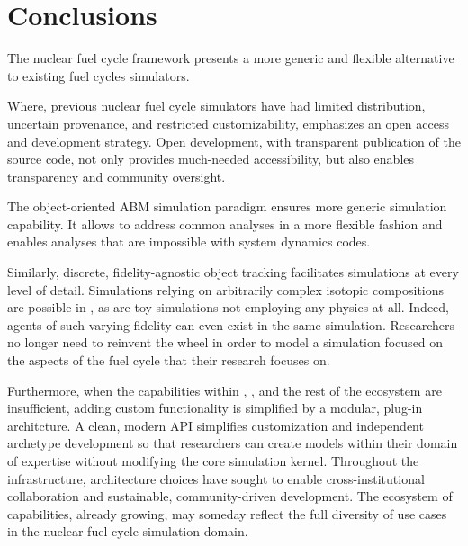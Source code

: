 

\section{Conclusions}


The \Cyclus nuclear fuel cycle framework presents a more generic and flexible 
alternative to existing fuel cycles simulators. 

Where, previous nuclear fuel cycle simulators have had limited distribution, 
uncertain provenance, and restricted customizability, \Cyclus emphasizes an 
open access and development strategy.  Open development, with transparent 
publication of the source code, not only provides much-needed accessibility, 
but also enables transparency and community oversight. 

The object-oriented \acrlong{ABM} simulation paradigm ensures more generic 
simulation capability. It allows \Cyclus to address common analyses in a more 
flexible fashion and enables analyses that are impossible with system dynamics 
codes. 

Similarly, discrete, fidelity-agnostic object tracking facilitates simulations 
at every level of detail. Simulations relying on arbitrarily complex isotopic 
compositions are possible in \Cyclus, as are  toy simulations not employing any 
physics at all. Indeed, agents of such varying fidelity can even exist in the 
same simulation. Researchers no longer need to reinvent the wheel in order to 
model a simulation focused on the aspects of the fuel cycle that their research 
focuses on.

Furthermore, when the capabilities within \Cyclus, \Cycamore, and the rest of 
the ecosystem are insufficient, adding custom functionality is simplified by a 
modular, plug-in architcture. A clean, modern \acrlong{API} simplifies 
customization and independent archetype development so that researchers can 
create models within their domain of expertise without modifying the core 
simulation kernel. Throughout the \Cyclus 
infrastructure, architecture choices have sought to enable cross-institutional 
collaboration and sustainable, community-driven development. The ecosystem 
of capabilities, already growing, may someday reflect the full diversity of use 
cases in the nuclear fuel cycle simulation domain.


